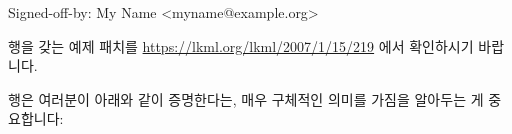 \iffalse

PDFs of this book are sporadically posted at
\url{https://kernel.org/pub/linux/kernel/people/paulmck/perfbook/perfbook.html}
and at
\url{http://www.rdrop.com/users/paulmck/perfbook/}.

The actual process of contributing patches and sending \co{git pull}
requests is similar to that of the Linux kernel, which is documented
here:
\url{https://www.kernel.org/doc/html/latest/process/submitting-patches.html}.
One important requirement is that each patch (or commit, in the case
of a \co{git pull} request) must contain a valid \co{Signed-off-by:} line,
which has the following format:

\fi

\begin{VerbatimU}
Signed-off-by: My Name <myname@example.org>
\end{VerbatimU}

 행을 갖는 예제 패치를
\url{https://lkml.org/lkml/2007/1/15/219} 에서 확인하시기 바랍니다.

 행은 여러분이 아래와 같이 증명한다는, 매우 구체적인 의미를
가짐을 알아두는 게 중요합니다:

\iffalse

Please see \url{https://lkml.org/lkml/2007/1/15/219} for an example
patch containing a \co{Signed-off-by:} line.

It is important to note that the \co{Signed-off-by:} line has
a very specific meaning, namely that you are certifying that:

\fi

